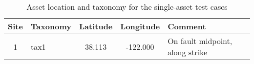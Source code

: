 \begin{table}

\centering
\begin{tabular}{ c l c c l }

\hline
\rowcolor{anti-flashwhite}
\bf{Site} & \bf{Taxonomy} & \bf{Latitude} & \bf{Longitude} & \bf{Comment} \\
\hline
1 & tax1 & 38.113 & -122.000 & On fault midpoint, along strike \\
\hline
\end{tabular}

\caption{Asset location and taxonomy for the single-asset test cases}
\label{tab:asset}
\end{table}